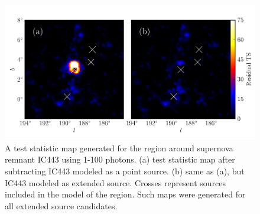 \documentclass[12pt,preprint]{aastex}
\newcommand{\gev}{\text{GeV}\xspace}
\begin{document}
\begin{figure}
  \begin{center}
  \includegraphics{ic443_plots/res_tsmap_ic443.pdf}

  \caption{
  A test statistic map generated for the region around supernova
  remnant IC443 using 1-100 \gev photons.  (a) test statistic map after
  subtracting IC443 modeled as a point source. (b) same as (a), but
  IC443 modeled as extended source. Crosses represent sources included
  in the model of the region.  Such maps were generated for all extended
  source candidates.}
  \label{res_tsmaps}
  \end{center}
\end{figure}
\end{document}
